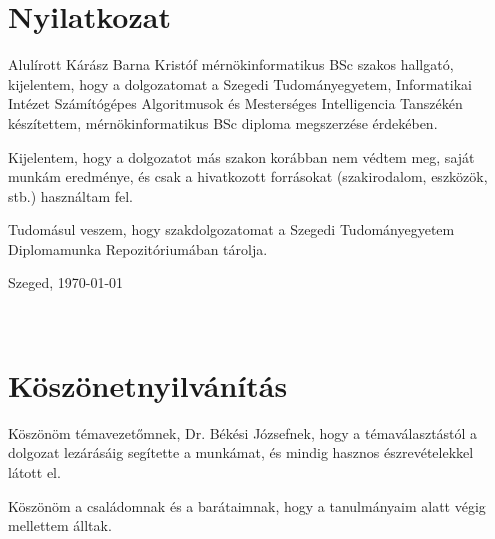 \documentclass[a4paper,12pt]{report}
\theoremstyle{definition}
\theoremstyle{remark}
\begin{document}
\chapter*{Nyilatkozat}

Alulírott Kárász Barna Kristóf mérnökinformatikus BSc szakos hallgató, kijelentem, hogy a dolgozatomat a Szegedi Tudományegyetem, Informatikai Intézet Számítógépes Algoritmusok és Mesterséges Intelligencia Tanszékén készítettem, mérnökinformatikus BSc diploma megszerzése érdekében.

Kijelentem, hogy a dolgozatot más szakon korábban nem védtem meg, saját munkám eredménye, és csak a hivatkozott forrásokat (szakirodalom, eszközök, stb.) használtam fel.

Tudomásul veszem, hogy szakdolgozatomat a Szegedi Tudományegyetem Diplomamunka Repozitóriumában tárolja.

\vspace{1cm}
\noindent Szeged, \today

\begin{flushright}
 \vspace*{1cm}
 \makebox[7cm]{\rule{6cm}{.4pt}}\\
\end{flushright}

\chapter*{Köszönetnyilvánítás}

Köszönöm témavezetőmnek, Dr. Békési Józsefnek, hogy a témaválasztástól a dolgozat lezárásáig segítette a munkámat, és mindig hasznos észrevételekkel látott el.

Köszönöm a családomnak és a barátaimnak, hogy a tanulmányaim alatt végig mellettem álltak.

\end{document}

